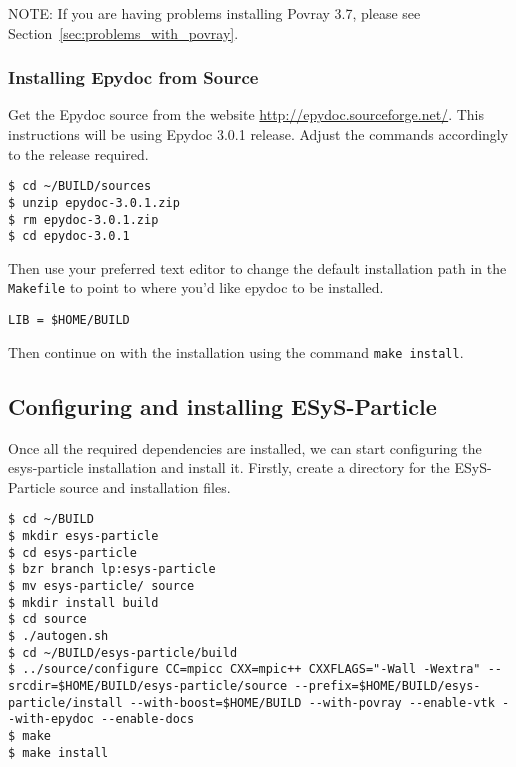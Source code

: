 NOTE: If you are having problems installing Povray 3.7, please see Section~\ref{sec:problems_with_povray}.

\subsubsection{Installing Epydoc from Source}
\label{sub:installing_epydoc_from_source}

Get the Epydoc source from the website \url{http://epydoc.sourceforge.net/}. This instructions will be using Epydoc 3.0.1 release. Adjust the commands accordingly to the release required.

\begin{lstlisting}[style=inlineBash]
$ cd ~/BUILD/sources
$ unzip epydoc-3.0.1.zip
$ rm epydoc-3.0.1.zip
$ cd epydoc-3.0.1
\end{lstlisting}

Then use your preferred text editor to change the default installation path in the \lstinline{Makefile} to point to where you'd like epydoc to be installed.

\begin{lstlisting}[style=inlineBash]
LIB = $HOME/BUILD
\end{lstlisting}

Then continue on with the installation using the command \lstinline{make install}.

\subsection{Configuring and installing ESyS-Particle}
\label{sec:configuring_and_installing_esys_particle}

Once all the required dependencies are installed, we can start configuring the esys-particle installation and install it. Firstly, create a directory for the ESyS-Particle source and installation files.

\begin{lstlisting}[style=inlineBash]
$ cd ~/BUILD
$ mkdir esys-particle
$ cd esys-particle
$ bzr branch lp:esys-particle 
$ mv esys-particle/ source
$ mkdir install build
$ cd source
$ ./autogen.sh
$ cd ~/BUILD/esys-particle/build
$ ../source/configure CC=mpicc CXX=mpic++ CXXFLAGS="-Wall -Wextra" --srcdir=$HOME/BUILD/esys-particle/source --prefix=$HOME/BUILD/esys-particle/install --with-boost=$HOME/BUILD --with-povray --enable-vtk --with-epydoc --enable-docs
$ make
$ make install
\end{lstlisting}


